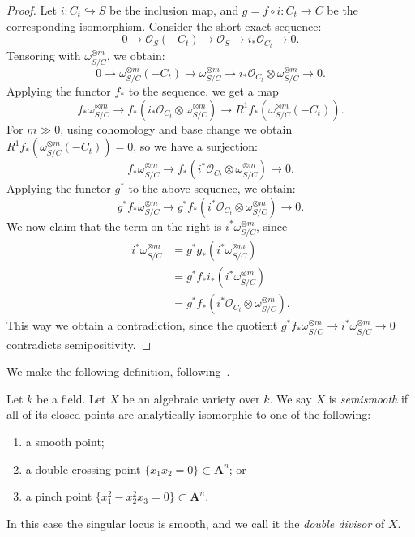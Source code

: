 \begin{proof}
Let $i:C_t\hookrightarrow S$ be the inclusion map, and $g=f\circ i:C_t\to C$ be the corresponding isomorphism.
Consider the short exact sequence:
$$0\to \mathcal{O}_S(-C_t)\to\mathcal{O}_S\to i_*\mathcal{O}_{C_t}\to 0.$$
Tensoring with $\omega_{S/C}^{\otimes m}$, we obtain:
$$0\to \omega_{S/C}^{\otimes m}(-C_t)\to \omega_{S/C}^{\otimes m}\to i_*\mathcal{O}_{C_t}\otimes\omega_{S/C}^{\otimes m}\to 0.$$
Applying the functor $f_*$ to the sequence, we get a map
$$f_*\omega_{S/C}^{\otimes m}\to f_*(i_*\mathcal{O}_{C_t}\otimes \omega_{S/C}^{\otimes m})\to R^1f_*(\omega_{S/C}^{\otimes m}(-C_t)).$$
For $m\gg 0$, using cohomology and base change we obtain $R^1f_*(\omega_{S/C}^{\otimes m}(-C_t))=0$, so we have a surjection:
$$f_*\omega_{S/C}^{\otimes m}\to f_*(i^*\mathcal{O}_{C_t}\otimes \omega_{S/C}^{\otimes m})\to 0.$$
Applying the functor $g^*$ to the above sequence, we obtain:
$$g^*f_*\omega_{S/C}^{\otimes m}\to g^*f_*(i^*\mathcal{O}_{C_t}\otimes \omega_{S/C}^{\otimes m})\to 0.$$
We now claim that the term on the right is $i^*\omega_{S/C}^{\otimes m}$, since
\begin{align}
i^*\omega_{S/C}^{\otimes m}& =g^*g_*(i^*\omega_{S/C}^{\otimes m})\nonumber\\
& =g^*f_*i_*(i^*\omega_{S/C}^{\otimes m})\nonumber\\
&=g^*f_*(i^*\mathcal{O}_{C_t}\otimes \omega_{S/C}^{\otimes m}).\nonumber
\end{align}
This way we obtain a contradiction, since the quotient $g^*f_*\omega_{S/C}^{\otimes m}\to i^*\omega_{S/C}^{\otimes m}\to 0$ contradicts semipositivity.
\end{proof}

We make the following definition, following~\cite[Definition 4.1(i)]{ko90}.

\begin{definition}
\label{definition-semismooth}
Let $k$ be a field.
Let $X$ be an algebraic variety over $k$.
We say $X$ is \textit{semismooth} if all of its closed points are analytically
isomorphic to one of the following:
\begin{enumerate}
\item a smooth point;
\item a double crossing point $\{x_1x_2 = 0\} \subset \mathbf{A}^n$; or
\item a pinch point $\{x_1^2 - x_2^2x_3 = 0\} \subset \mathbf{A}^n$.
\end{enumerate}
In this case the singular locus is smooth, and we call it the {\it double
divisor} of $X$.
\end{definition}


